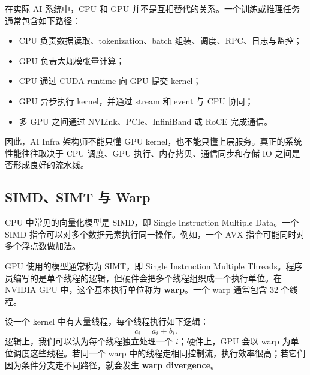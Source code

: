 在实际 AI 系统中，CPU 和 GPU 并不是互相替代的关系。一个训练或推理任务通常包含如下路径：

\begin{itemize}
  \item CPU 负责数据读取、tokenization、batch 组装、调度、RPC、日志与监控；
  \item GPU 负责大规模张量计算；
  \item CPU 通过 CUDA runtime 向 GPU 提交 kernel；
  \item GPU 异步执行 kernel，并通过 stream 和 event 与 CPU 协同；
  \item 多 GPU 之间通过 NVLink、PCIe、InfiniBand 或 RoCE 完成通信。
\end{itemize}

因此，AI Infra 架构师不能只懂 GPU kernel，也不能只懂上层服务。真正的系统性能往往取决于 CPU 调度、GPU 执行、内存拷贝、通信同步和存储 IO 之间是否形成良好的流水线。

\subsection{SIMD、SIMT 与 Warp}
\label{subsec:simd-simt-warp}

CPU 中常见的向量化模型是 SIMD，即 Single Instruction Multiple Data。一个 SIMD 指令可以对多个数据元素执行同一操作。例如，一个 AVX 指令可能同时对多个浮点数做加法。

GPU 使用的模型通常称为 SIMT，即 Single Instruction Multiple Threads。程序员编写的是单个线程的逻辑，但硬件会把多个线程组织成一个执行单位。在 NVIDIA GPU 中，这个基本执行单位称为 \textbf{warp}。一个 warp 通常包含 $32$ 个线程。

设一个 kernel 中有大量线程，每个线程执行如下逻辑：
\[
  c_i=a_i+b_i.
\]
逻辑上，我们可以认为每个线程独立处理一个 $i$；硬件上，GPU 会以 warp 为单位调度这些线程。若同一个 warp 中的线程走相同控制流，执行效率很高；若它们因为条件分支走不同路径，就会发生 \textbf{warp divergence}。

